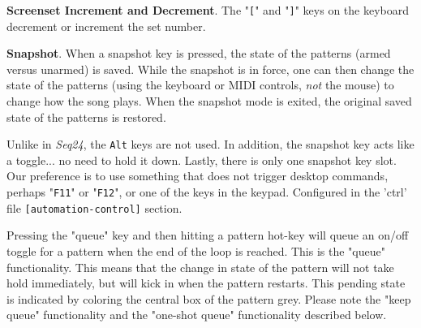    \index{keys![}
   \textbf{Screenset Increment and Decrement}.
   The "\texttt{[}" and
   \index{keys!]}
   "\texttt{]}" keys on the keyboard decrement or increment the set number.

   \textbf{Snapshot}.
   When a snapshot key is pressed, the state of the patterns
   (armed versus unarmed) is saved.  While the
   snapshot is in force, one can then change the state of the patterns
   (using the keyboard or MIDI controls, \textsl{not} the mouse)
   to change how the song plays.  When the snapshot mode is exited, the
   original saved state of the patterns is restored.

   Unlike in \textsl{Seq24}, the \texttt{Alt} keys are not used.
   In addition, the snapshot key acts like a toggle... no need to hold it down.
   Lastly, there is only one snapshot key slot.
   Our preference is to use something that does not trigger desktop
   commands, perhaps "\texttt{F11}" or "\texttt{F12}", or one of the keys in
   the keypad.
   Configured in the 'ctrl' file
   \texttt{[automation-control]} section.

   Pressing the "queue" key and then hitting a pattern hot-key
   will queue an on/off toggle for a pattern when the end of the loop is
   reached.
   This is the "queue" functionality.
   This means that the change in state of the pattern will not take hold
   immediately, but will kick in when the pattern restarts.
   This pending state is indicated by coloring the central box of the
   pattern grey.
   Please note the "keep queue" functionality and
   the "one-shot queue" functionality described below.

\begin{comment}

\begin{figure}[H]
   \centering 
   \texttt{[image: roll.png]}
   \caption{Pattern Coloration when Queued}
   \label{fig:queueing_coloration}
\end{figure}

   This figure shows

\end{comment}

